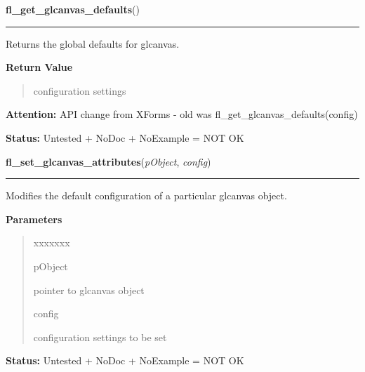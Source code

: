 \hspace{.8\funcindent}\begin{boxedminipage}{\funcwidth}

    \raggedright \textbf{fl\_get\_glcanvas\_defaults}()

    \vspace{-1.5ex}

    \rule{\textwidth}{0.5\fboxrule}
\setlength{\parskip}{2ex}
    Returns the global defaults for glcanvas.

\setlength{\parskip}{1ex}
      \textbf{Return Value}
    \vspace{-1ex}

      \begin{quote}
      configuration settings

      \end{quote}

\textbf{Attention:} API change from XForms - old was fl\_get\_glcanvas\_defaults(config)



\textbf{Status:} Untested + NoDoc + NoExample = NOT OK



    \end{boxedminipage}

    \label{xformslib:library:fl_set_glcanvas_attributes}

    \vspace{0.5ex}

\hspace{.8\funcindent}\begin{boxedminipage}{\funcwidth}

    \raggedright \textbf{fl\_set\_glcanvas\_attributes}(\textit{pObject}, \textit{config})

    \vspace{-1.5ex}

    \rule{\textwidth}{0.5\fboxrule}
\setlength{\parskip}{2ex}
    Modifies the default configuration of a particular glcanvas object.

\setlength{\parskip}{1ex}
      \textbf{Parameters}
      \vspace{-1ex}

      \begin{quote}
        \begin{Ventry}{xxxxxxx}

          \item[pObject]

          pointer to glcanvas object

          \item[config]

          configuration settings to be set

        \end{Ventry}

      \end{quote}

\textbf{Status:} Untested + NoDoc + NoExample = NOT OK



    \end{boxedminipage}

